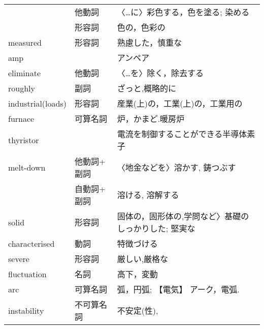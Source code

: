\documentclass[fleqn,9pt,a4paper,dvipdfmx]{jsarticle}
\begin{document}
\begin{enumerate}
\begin{table}[h]
\begin{tabular}{l|ll}
                             & 他動詞                            & 〈…に〉彩色する，色を塗る; 染める            \\
                             & 形容詞                            & 色の，色彩の                        \\ \hline
  measured                   & 形容詞                            & 熟慮した，慎重な                      \\ \hline
  amp                        &                                 & アンペア                             \\\hline
  eliminate                  & 他動詞                            & 〈…を〉除く，除去する                   \\ \hline
  roughly                    & 副詞                             & ざっと,概略的に                       \\ \hline
  industrial(loads)          & 形容詞                            & 産業(上)の，工業(上)の，工業用の            \\ \hline
  furnace                    & 可算名詞                           & 炉，かまど.暖房炉                     \\ \hline
  thyristor                  &                                & 電流を制御することができる半導体素子             \\ \hline
  melt-down                  & 他動詞+ 副詞 & 〈地金などを〉溶かす,   鋳つぶす            \\
                             & 自動詞+ 副詞                        & 溶ける, 溶解する                     \\ \hline
  solid                      & 形容詞                            & 固体の，固形体の,学問など〉基礎のしっかりした; 堅実な  \\ \hline
  characterised              & 動詞                             & 特徴づける                          \\ \hline
  severe                     & 形容詞                            & 厳しい,厳格な                        \\ \hline
  fluctuation                & 名詞                             & 高下，変動                        \\ \hline
  arc                        & 可算名詞                           & 弧，円弧; 【電気】 アーク，電弧.             \\ \hline
  instability                & 不可算名詞                          & 不安定(性),                        \\ \hline

\end{tabular}
\end{table}
\end{enumerate}
\end{document}
